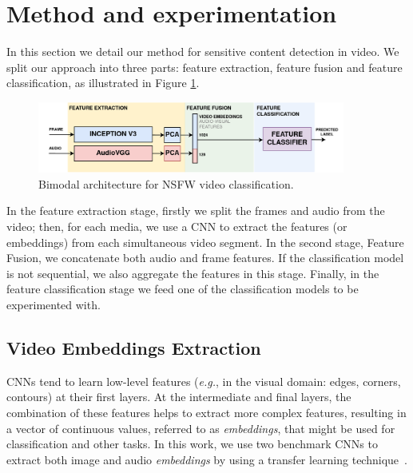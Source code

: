 \section{Method and experimentation}
\label{sec:method}
In this section we detail our method for sensitive content detection in video. We split our approach into three parts: feature extraction, feature fusion and feature classification, as illustrated in Figure \ref{fig:model}.
\begin{figure}[!ht]
    \centering
    \includegraphics[width=0.9\textwidth]{img/model-2.png}
    \caption{Bimodal architecture for NSFW video classification.}
    \label{fig:model}
    \vspace{-1em}
\end{figure}

In the feature extraction stage, firstly we split the frames and audio from the video; then, for each media, we use a CNN to extract the features (or embeddings) from each simultaneous video segment. In the second stage, Feature Fusion, we concatenate both audio and frame features. If the classification model is not sequential, we also aggregate the features in this stage. Finally, in the feature classification stage we feed one of the classification models to be experimented with.

\subsection{Video Embeddings Extraction}
\label{subsec:video_features}

CNNs tend to learn low-level features (\textit{e.g.}, in the visual domain: edges, corners, contours) at their first layers. At the intermediate and final layers, the combination of these features helps to extract more complex features, resulting in a vector of continuous values, referred to as \textit{embeddings}, that might be used for classification and other tasks. In this work, we use two benchmark CNNs to extract both image and audio \textit{embeddings} by using a transfer learning technique~\cite{tan2018survey}.





